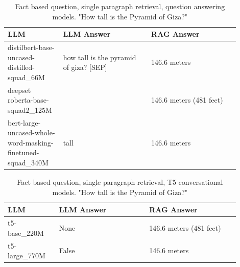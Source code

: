 \documentclass{wseas}
\begin{document}
\begin{table}[htbp]
  \centering
  \caption{Fact based question, single paragraph retrieval, question answering models. "How tall is the Pyramid of Giza?"} %
  \label{tab:experiment_R_1_paragraph_Q_fact_M_QaModels_table}
  \begin{tabular}{|p{0.2\linewidth}|p{0.35\linewidth}|p{0.35\linewidth}|}
    \hline
    \textbf{LLM} & \textbf{LLM Answer} & \textbf{RAG Answer} \\ \hline
    distilbert-base-uncased-distilled-squad\_66M & how tall is the pyramid of giza? {[}SEP{]} & 146.6 meters \\ \hline
    deepset roberta-base-squad2\_125M &  & 146.6 meters (481 feet) \\ \hline
    bert-large-uncased-whole-word-masking-finetuned-squad\_340M & tall & 146.6 meters \\ \hline
  \end{tabular}
\end{table}
\begin{table}[htbp]
  \centering
  \caption{Fact based question, single paragraph retrieval, T5 conversational models. "How tall is the Pyramid of Giza?"} %
  \label{tab:experiment_R_1_paragraph_Q_fact_M_T5Models_table}
  \begin{tabular}{|p{0.20\linewidth}|p{0.35\linewidth}|p{0.35\linewidth}|}
    \hline
    \textbf{LLM} & \textbf{LLM Answer} & \textbf{RAG Answer} \\ \hline
    t5-base\_220M & None & 146.6 meters (481 feet) \\ \hline
    t5-large\_770M & False & 146.6 meters \\ \hline
  \end{tabular}
\end{table}
\end{document}
